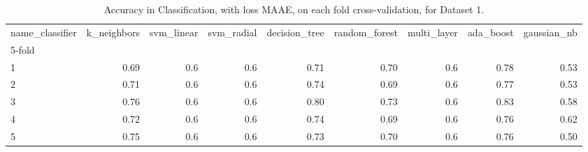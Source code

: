 \begin{table}
\centering
\caption{Accuracy in Classification, with loss MAAE, on each fold cross-validation, for Dataset 1.}
\label{table:acc-maae-boon-fold-2}
\begin{tabular}{lrrrrrrrr}
\toprule
name\_classifier &  k\_neighbors &  svm\_linear &  svm\_radial &  decision\_tree &  random\_forest &  multi\_layer &  ada\_boost &  gaussian\_nb \\
5-fold &              &             &             &                &                &              &            &              \\
\midrule
1      &         0.69 &         0.6 &         0.6 &           0.71 &           0.70 &          0.6 &       0.78 &         0.53 \\
2      &         0.71 &         0.6 &         0.6 &           0.74 &           0.69 &          0.6 &       0.77 &         0.53 \\
3      &         0.76 &         0.6 &         0.6 &           0.80 &           0.73 &          0.6 &       0.83 &         0.58 \\
4      &         0.72 &         0.6 &         0.6 &           0.74 &           0.69 &          0.6 &       0.76 &         0.62 \\
5      &         0.75 &         0.6 &         0.6 &           0.73 &           0.70 &          0.6 &       0.76 &         0.50 \\
\bottomrule
\end{tabular}
\end{table}
